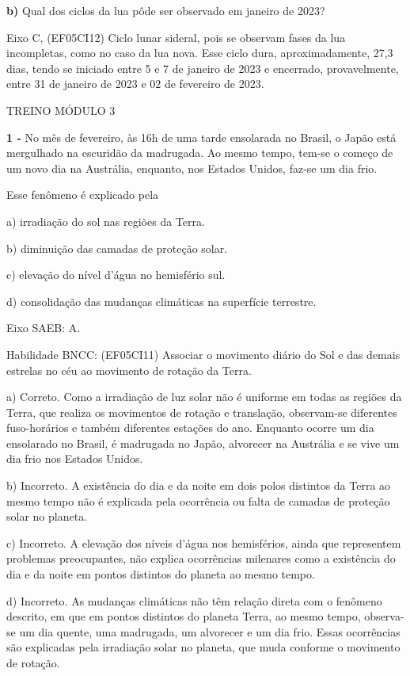 \textbf{b)} Qual dos ciclos da lua pôde ser observado em janeiro de
2023?

Eixo C, (EF05CI12) Ciclo lunar sideral, pois se observam fases da lua
incompletas, como no caso da lua nova. Esse ciclo dura, aproximadamente,
27,3 dias, tendo se iniciado entre 5 e 7 de janeiro de 2023 e encerrado,
provavelmente, entre 31 de janeiro de 2023 e 02 de fevereiro de 2023.

\protect\hypertarget{_bo7fkr4tenp}{}{}TREINO MÓDULO 3

\textbf{1 -} No mês de fevereiro, às 16h de uma tarde ensolarada no
Brasil, o Japão está mergulhado na escuridão da madrugada. Ao mesmo
tempo, tem-se o começo de um novo dia na Austrália, enquanto, nos
Estados Unidos, faz-se um dia frio.

Esse fenômeno é explicado pela

a) irradiação do sol nas regiões da Terra.

b) diminuição das camadas de proteção solar.

c) elevação do nível d'água no hemisfério sul.

d) consolidação das mudanças climáticas na superfície terrestre.

Eixo SAEB: A.

Habilidade BNCC: (EF05CI11) Associar o movimento diário do Sol e das
demais estrelas no céu ao movimento de rotação da Terra.

a) Correto. Como a irradiação de luz solar não é uniforme em todas as
regiões da Terra, que realiza os movimentos de rotação e translação,
observam-se diferentes fuso-horários e também diferentes estações do
ano. Enquanto ocorre um dia ensolarado no Brasil, é madrugada no Japão,
alvorecer na Austrália e se vive um dia frio nos Estados Unidos.

b) Incorreto. A existência do dia e da noite em dois polos distintos da
Terra ao mesmo tempo não é explicada pela ocorrência ou falta de camadas
de proteção solar no planeta.

c) Incorreto. A elevação dos níveis d'água nos hemisférios, ainda que
representem problemas preocupantes, não explica ocorrências milenares
como a existência do dia e da noite em pontos distintos do planeta ao
mesmo tempo.

d) Incorreto. As mudanças climáticas não têm relação direta com o
fenômeno descrito, em que em pontos distintos do planeta Terra, ao mesmo
tempo, observa-se um dia quente, uma madrugada, um alvorecer e um dia
frio. Essas ocorrências são explicadas pela irradiação solar no planeta,
que muda conforme o movimento de rotação.

